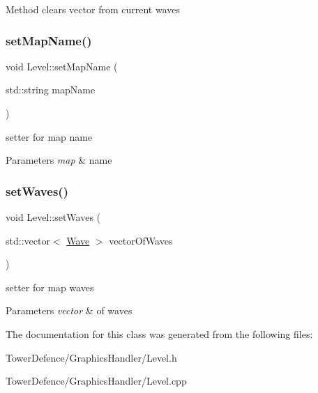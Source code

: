 Method clears vector from current waves \mbox{\label{class_level_af30bbc6f28d1373854c316a8226503ba}} 
\subsubsection{\texorpdfstring{set\+Map\+Name()}{setMapName()}}
{\footnotesize\ttfamily void Level\+::set\+Map\+Name (\begin{DoxyParamCaption}\item[{std\+::string}]{map\+Name }\end{DoxyParamCaption})}



setter for map name 


\begin{DoxyParams}{Parameters}
{\em map} & name \\
\hline
\end{DoxyParams}
\mbox{\label{class_level_adc3fb45bf2db8c85e60a6496d8bb5d0c}} 
\subsubsection{\texorpdfstring{set\+Waves()}{setWaves()}}
{\footnotesize\ttfamily void Level\+::set\+Waves (\begin{DoxyParamCaption}\item[{std\+::vector$<$ \mbox{\hyperlink{class_wave}{Wave}} $>$}]{vector\+Of\+Waves }\end{DoxyParamCaption})}



setter for map waves 


\begin{DoxyParams}{Parameters}
{\em vector} & of waves \\
\hline
\end{DoxyParams}


The documentation for this class was generated from the following files\+:\begin{DoxyCompactItemize}
\item 
Tower\+Defence/\+Graphics\+Handler/Level.\+h\item 
Tower\+Defence/\+Graphics\+Handler/Level.\+cpp\end{DoxyCompactItemize}
